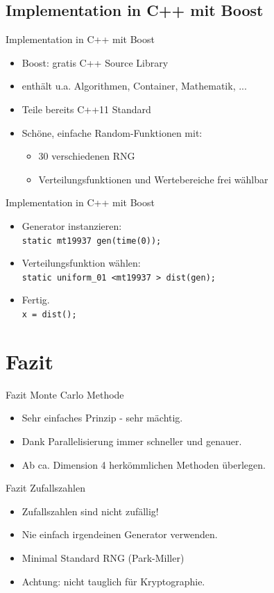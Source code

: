 \documentclass{beamer}
\begin{document}
\subsection[Boost]{Implementation in C++ mit Boost}
\begin{frame}{Implementation in C++ mit Boost}
	\begin{itemize}
		\item Boost: gratis C++ Source Library
		\item enthält u.a. Algorithmen, Container, Mathematik, ... 
		\item Teile bereits C++11 Standard
		\item Schöne, einfache Random-Funktionen mit:
		\begin{itemize}
			\item 30 verschiedenen RNG
			\item Verteilungsfunktionen und Wertebereiche frei wählbar
		\end{itemize}
	\end{itemize}
\end{frame}
\begin{frame}{Implementation in C++ mit Boost}
	\begin{itemize}
		\item Generator instanzieren: \\
			\texttt{static mt19937 gen(time(0));}
		\item Verteilungsfunktion wählen: \\
			\texttt{static uniform\_01 <mt19937 > dist(gen);}
		\item Fertig. \\
			\texttt{x = dist();}
	\end{itemize}
\end{frame}

\section{Fazit}
\begin{frame}{Fazit Monte Carlo Methode}
	\begin{itemize}
		\item Sehr einfaches Prinzip - sehr mächtig.
		\item Dank Parallelisierung immer schneller und genauer.
		\item Ab ca. Dimension 4 herkömmlichen Methoden überlegen.
	\end{itemize}
\end{frame}
\begin{frame}{Fazit Zufallszahlen}
	\begin{itemize}
		\item Zufallszahlen sind nicht zufällig!
		\item Nie einfach irgendeinen Generator verwenden.
		\item Minimal Standard RNG (Park-Miller)
		\item Achtung: nicht tauglich für Kryptographie.
	\end{itemize}
\end{frame}
\end{document}
